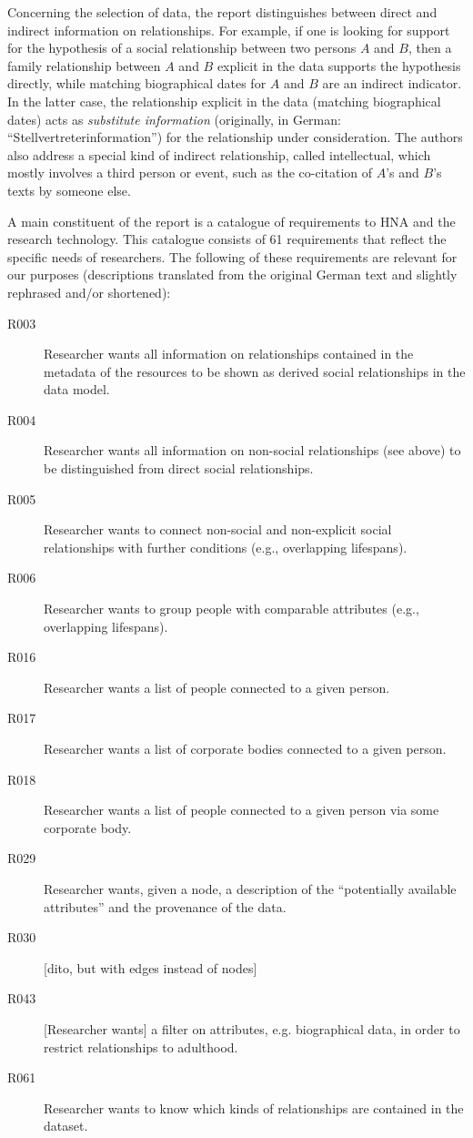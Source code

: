 
Concerning the selection of data, the report distinguishes between
direct and indirect information on relationships.
For example, if one is looking for support for the hypothesis of a social relationship
between two persons $A$ and $B$, then a family relationship between $A$ and $B$ explicit in the data
supports the hypothesis directly, while matching biographical dates for $A$ and $B$
are an indirect indicator. In the latter case, the relationship
explicit in the data (matching biographical dates) acts as \emph{substitute information}
(originally, in German: \enquote{Stellvertreterinformation}) for the relationship under consideration.
The authors also address a special kind of indirect relationship,
called intellectual, which mostly involves a third person
or event, such as the co-citation of $A$'s and $B$'s texts by someone else.

A main constituent of the report is a catalogue of requirements
to \gls{HNA} and the research technology. This catalogue consists of 61
requirements that reflect the specific needs of researchers.
The following of these requirements are relevant for our purposes
(descriptions translated from the original German text and slightly rephrased and/or shortened):
%
\begin{description}
  \item[R003]
    Researcher wants all information on relationships contained in the metadata of the resources
    to be shown as derived social relationships in the data model.
  \item[R004]
    Researcher wants all information on non-social
    relationships (see above) to be distinguished from direct social relationships.
  \item[R005]
    Researcher wants to connect non-social and non-explicit social relationships
    with further conditions (e.g., overlapping lifespans).
  \item[R006]
    Researcher wants to group people with comparable attributes (e.g., overlapping lifespans).
  \item[R016]
    Researcher wants a list of people connected to a given person.
  \item[R017]
    Researcher wants a list of corporate bodies connected to a given person.
  \item[R018]
    Researcher wants a list of people connected to a given person via some corporate body.
  \item[R029]
    Researcher wants, given a node, a description of the \enquote{potentially available attributes}
    and the provenance of the data.
  \item[R030]
    [dito, but with edges instead of nodes]
  \item[R043]
    [Researcher wants] a filter on attributes, e.g. biographical data, in order to
    restrict relationships to adulthood.
  \item[R061]
    Researcher wants to know which kinds of relationships are contained in the dataset.
\end{description}

